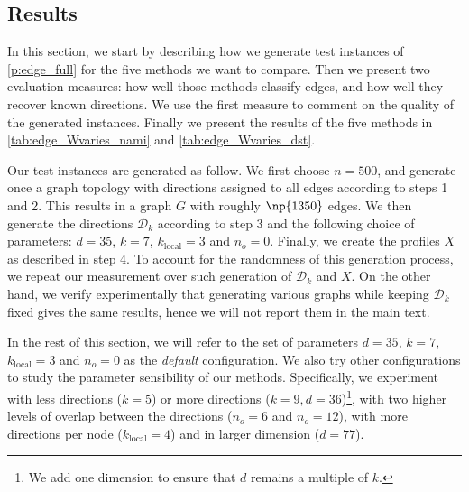 \subsection{Results}
\label{sub:edge_synth_results}

In this section, we start by describing how we generate test instances of \autoref{p:edge_full} for
the five methods we want to compare.  Then we present two evaluation measures: how well those
methods classify edges, and how well they recover known directions. We use the first measure to
comment on the quality of the generated instances. Finally we present the results of the five
methods in \autoref{tab:edge_Wvaries_nami} and \autoref{tab:edge_Wvaries_dst}.

Our test instances are generated as follow. We first choose $n=500$, and generate once a graph
topology with directions assigned to all edges according to steps 1 and 2. This results in a graph
$G$ with roughly $\np{1350}$ edges. We then generate the directions $\mathcal{D}_k$ according to
step 3 and the following choice of parameters: $d=35$, $k=7$, $k_{\mathrm{local}}=3$ and $n_o=0$.
Finally, we create the profiles $X$ as described in step 4.
To account for the randomness of this generation process, we repeat our
measurement over  such generation of $\mathcal{D}_k$ and $X$. On the other hand, we verify experimentally that
generating various graphs while keeping $\mathcal{D}_k$ fixed gives the same results, hence we will
not report them in the main text.

In the rest of this section, we will refer to the set of parameters $d=35$, $k=7$,
$k_{\mathrm{local}}=3$ and $n_o=0$ as the \emph{default} configuration.
We also try other configurations to study the parameter sensibility of our methods. Specifically, we
experiment with less directions ($k=5$) or more directions ($k=9, d=36$)\footnote{We add one
dimension to ensure that $d$ remains a multiple of $k$.}, with two higher levels of overlap between
the directions ($n_o=6$ and $n_o=12$), with more directions per node ($k_{\mathrm{local}}=4$) and in
larger dimension ($d=77$).

\medskip

